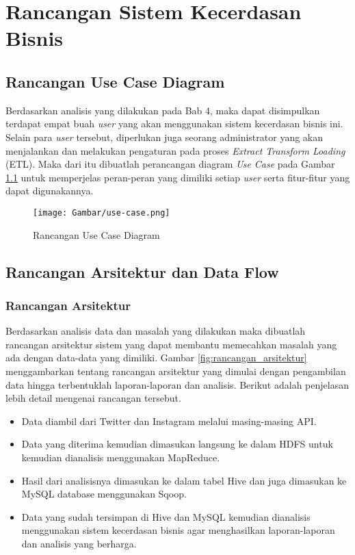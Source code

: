 \chapter{Rancangan Sistem Kecerdasan Bisnis}
\section{Rancangan Use Case Diagram}
Berdasarkan analisis yang dilakukan pada Bab 4, maka dapat disimpulkan terdapat empat buah \textit{user} yang akan menggunakan sistem kecerdasan bisnis ini. Selain para \textit{user} tersebut, diperlukan juga seorang administrator yang akan menjalankan dan melakukan pengaturan pada proses \textit{Extract Transform Loading} (ETL). Maka dari itu dibuatlah perancangan diagram \textit{Use Case} pada Gambar \ref{fig:rancangan_use_case_diagram} untuk memperjelas peran-peran yang dimiliki setiap \textit{user} serta fitur-fitur yang dapat digunakannya.

\begin{figure}[H]
	\centering
	\texttt{[image: Gambar/use-case.png]}
	\caption[Rancangan Use Case Diagram]{Rancangan Use Case Diagram} 
	\label{fig:rancangan_use_case_diagram}
\end{figure}

\section{Rancangan Arsitektur dan Data Flow}
\subsection{Rancangan Arsitektur}
Berdasarkan analisis data dan masalah yang dilakukan maka dibuatlah rancangan arsitektur sistem yang dapat membantu memecahkan masalah yang ada dengan data-data yang dimiliki. Gambar \ref{fig:rancangan_arsitektur} menggambarkan tentang rancangan arsitektur yang dimulai dengan pengambilan data hingga terbentuklah laporan-laporan dan analisis. Berikut adalah penjelasan lebih detail mengenai rancangan tersebut.

\begin{itemize}
	\item Data diambil dari Twitter dan Instagram melalui masing-masing API. 
	\item Data yang diterima kemudian dimasukan langsung ke dalam HDFS untuk kemudian dianalisis menggunakan MapReduce.
	\item Hasil dari analisisnya dimasukan ke dalam tabel Hive dan juga dimasukan ke MySQL database menggunakan Sqoop.
	\item Data yang sudah tersimpan di Hive dan MySQL kemudian dianalisis menggunakan sistem kecerdasan bisnis agar menghasilkan laporan-laporan dan analisis yang berharga.
\end{itemize}

